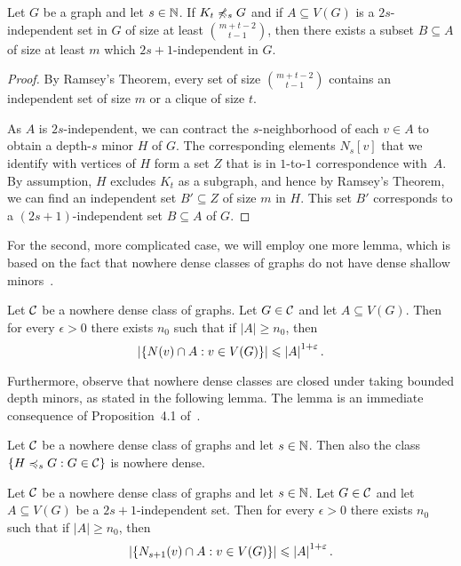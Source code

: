 \begin{lemma}\label{lem:ramsey1}
Let $G$ be a graph and let $s\in \mathbb{N}$. If $K_t\not\preccurlyeq_{s} G$ and 
if $A\subseteq V(G)$ is a $2s$-independent set in $G$ of
size at least $\binom{m+t-2}{t-1}$, then there exists
a subset $B\subseteq A$ of size at least $m$ which $2s+1$-independent in $G$. 
\end{lemma}
\begin{proof}
By Ramsey's Theorem, every set of size $\binom{m+t-2}{t-1}$ contains an
independent set of size $m$ or a clique of size $t$. 

As $A$ is $2s$-independent, we can contract the $s$-neighborhood
of each $v\in A$ to obtain a depth-$s$ minor $H$ of $G$. The corresponding elements $N_s[v]$ that we identify with vertices of $H$ form a set $Z$ that is in \mbox{$1$-to-$1$} correspondence 
with~$A$. By assumption, 
$H$ excludes $K_t$ as a subgraph, and hence by Ramsey's Theorem,
we can find an independent set $B'\subseteq Z$ of size $m$ in $H$. 
This set $B'$ corresponds to a $(2s+1)$-independent set $B\subseteq A$ of $G$. 
\end{proof}

For the second, more complicated case, 
we will employ one more lemma, which is based on the fact that
nowhere dense classes of graphs do not have dense 
shallow minors~\cite{dvorak2007asymptotical,jiang2011compact}. 

\begin{lemma}\label{lem:diversity}
Let $\mathcal{C}$ be a nowhere dense class of graphs. Let $G\in \mathcal{C}$ and let $A\subseteq V(G)$. 
Then for every $\epsilon>0$ there exists $n_0$ such that if $|A|\geq n_0$, then 
\[\left\lvert\{N(v)\cap A : v\in V(G)\}\right\rvert\leqslant\left\lvert A\right\rvert^{1+\varepsilon}.\]
\end{lemma}

Furthermore, observe that nowhere dense classes are closed under
taking bounded depth minors, as stated in the following lemma. 
The lemma is an immediate consequence of Proposition~4.1 
of~\cite{sparsity}. 

\begin{lemma}
Let $\mathcal{C}$ be a nowhere dense class of graphs and let $s\in \mathbb{N}$. 
Then also the class $\{H \preccurlyeq_s G : G\in \mathcal{C}\}$ is nowhere dense. 
\end{lemma}

\begin{corollary}\label{lem:gajarsky}
Let $\mathcal{C}$ be a nowhere dense class of graphs and let $s\in \mathbb{N}$. 
Let $G\in \mathcal{C}$ and let $A\subseteq V(G)$ be a $2s+1$-independent
set. 
Then for every $\epsilon>0$ there exists $n_0$ such that if $|A|\geq n_0$, then 
\[\left\lvert\{N_{s+1}(v)\cap A : v\in V(G)\}\right\rvert\leqslant\left\lvert A\right\rvert^{1+\varepsilon}.\]
\end{corollary}

